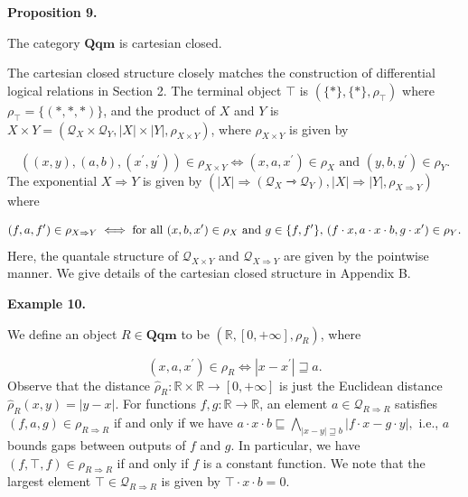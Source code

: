 \documentclass[10pt,a4paper]{amsart}
\begin{document}
 
 
\par\medskip\noindent\textbf{Proposition 9.}\par
 
 
The category $\mathbf{Qqm}$ is cartesian closed.\par
 
 
 
 
The cartesian closed structure closely matches the construction of differential logical relations in Section 2. The terminal object $\top$ is $(\{\ast\},\{\ast\},\rho_{\top})$ where $\rho_{\top}=\{(\ast,\ast,\ast)\}$, and the product of $X$ and $Y$ is $X\times Y=(\mathcal{Q}_{X}\times\mathcal{Q}_{Y},|X|\times|Y|,\rho_{X\times Y})$, where $\rho_{X\times Y}$ is given by\par
    \[((x,y),(a,b),(x^{\prime},y^{\prime}))\in\rho_{X\times Y}\iff(x,a,x^{\prime})%
\in\rho_{X}\text{ and }(y,b,y^{\prime})\in\rho_{Y}.\]    
The exponential $X\Rightarrow Y$ is given by $(|X|\Rightarrow(\mathcal{Q}_{X}\rightarrowtriangle\mathcal{Q}_{Y}),|X|%
\Rightarrow|Y|,\rho_{X\Rightarrow Y})$ where\par
    \[(f,a,f^{\prime})\in\rho_{X\Rightarrow Y}\iff\text{for all }(x,b,x^{\prime})\in%
\rho_{X}\text{ and }g\in\{f,f^{\prime}\},\,(f\cdot x,a\cdot x\cdot b,g\cdot x^%
{\prime})\in\rho_{Y}.\]    
Here, the quantale structure of $\mathcal{Q}_{X\times Y}$ and $\mathcal{Q}_{X\Rightarrow Y}$ are given by the pointwise manner. We give details of the cartesian closed structure in Appendix B.\par
 
 
 
\par\medskip\noindent\textbf{Example 10.}\par
 
 
We define an object $R\in\mathbf{Qqm}$ to be $(\mathbb{R},[0,+\infty],\rho_{R})$, where\par
    \[(x,a,x^{\prime})\in\rho_{R}\iff|x-x^{\prime}|\sqsupseteq a.\]    
Observe that the distance $\widehat{\rho}_{R}:\mathbb{R}\times\mathbb{R}\to[0,+\infty]$ is just the Euclidean distance $\widehat{\rho}_{R}(x,y)=|y-x|$. For functions $f,g\colon\mathbb{R}\to\mathbb{R}$, an element $a\in\mathcal{Q}_{R\Rightarrow R}$ satisfies $(f,a,g)\in\rho_{R\Rightarrow R}$ if and only if we have $a\cdot x\cdot b\sqsubseteq\bigwedge_{|x-y|\sqsupseteq b}|f\cdot x-g\cdot y|,$ i.e., $a$ bounds gaps between outputs of $f$ and $g$. In particular, we have $(f,\top,f)\in\rho_{R\Rightarrow R}$ if and only if $f$ is a constant function. We note that the largest element $\top\in\mathcal{Q}_{R\Rightarrow R}$ is given by $\top\cdot x\cdot b=0$.\par
 
\end{document}
